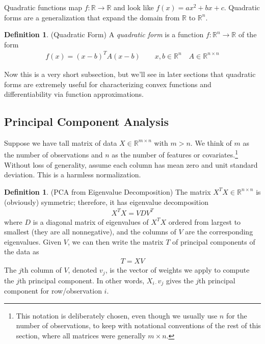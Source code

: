 \documentclass[12pt]{article}
\numberwithin{equation}{section} %
\theoremstyle{plain}
\theoremstyle{definition}
\newtheorem{defn}[thm]{Definition}
\theoremstyle{remark}
\newcommand{\R}{\mathbb{R}}
\newcommand{\Rn}{\mathbb{R}^n}
\newcommand{\Rmn}{\mathbb{R}^{m\times n}}
\newcommand{\Rnn}{\mathbb{R}^{n\times n}}
\begin{document}
Quadratic functions map $f:\R\rightarrow\R$ and look like $f(x)=ax^2 +
bx+c$. Quadratic forms are a generalization that expand the domain from
$\R$ to $\Rn$.

\begin{defn}{(Quadratic Form)}
A \emph{quadratic form} is a function $f:\Rn\rightarrow\R$ of the form
\begin{align*}
  f(x) = (x-b)^TA(x-b)
  \qquad x,b\in\Rn \quad A\in\Rnn
\end{align*}
\end{defn}

Now this is a very short subsection, but we'll see in later sections
that quadratic forms are extremely useful for characterizing convex
functions and differentiability via function approximations.


\clearpage
\subsection{Principal Component Analysis}

Suppose we have tall matrix of data $X\in\Rmn$ with $m>n$.
We think of $m$ as the number of observations and $n$ as the number of
features or covariates.\footnote{%
  This notation is deliberately chosen, even though we usually use $n$
  for the number of observations, to keep with notational conventions of
  the rest of this section, where all matrices were generally
  $m\times n$.
}
Without loss of generality, assume each
column has mean zero and unit standard deviation. This is a
harmless normalization.

\begin{defn}(PCA from Eigenvalue Decomposition)
The matrix $X^TX\in\Rnn$ is (obviously) symmetric; therefore, it has
eigenvalue decomposition
\begin{align*}
  X^TX = VDV^T
\end{align*}
where $D$ is a diagonal matrix of eigenvalues of $X^TX$ ordered from
largest to smallest (they are all nonnegative), and the columns of $V$
are the corresponding eigenvalues.
Given $V$, we can then write the matrix $T$ of principal components of
the data as
\begin{align*}
  T = XV
\end{align*}
The $j$th column of $V$, denoted $v_j$, is the vector of weights we
apply to compute the $j$th principal component. In other words,
$X_{i\cdot}v_j$ gives the $j$th principal component for row/observation
$i$.
\end{defn}
\end{document}
